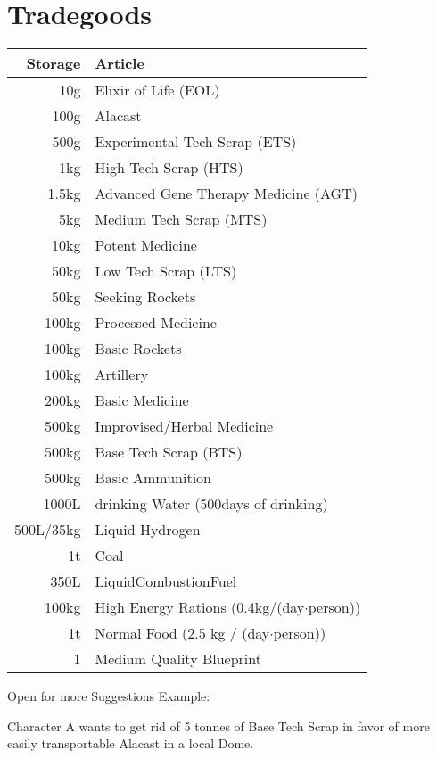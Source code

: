 \section{Tradegoods}\label{sec:tradegoods}
\begin{tabular}{|r|l|}
    \hline
    Storage & Article\\\hline
    10g & Elixir of Life (EOL)\\\hline
    100g & Alacast\\\hline
    500g & Experimental Tech Scrap (ETS)\\\hline
    1kg & High Tech Scrap (HTS)\\\hline
    1.5kg & Advanced Gene Therapy Medicine (AGT)\\\hline
    5kg & Medium Tech Scrap (MTS)\\\hline
    10kg & Potent Medicine\\\hline
    50kg & Low Tech Scrap (LTS)\\\hline
    50kg & Seeking Rockets\\\hline
    100kg & Processed Medicine\\\hline
    100kg & Basic Rockets\\\hline
    100kg & Artillery\\\hline
    200kg & Basic Medicine\\\hline
    500kg & Improvised/Herbal Medicine\\\hline
    500kg & Base Tech Scrap (BTS)\\\hline
    500kg & Basic Ammunition\\\hline
    1000L & drinking Water (500days of drinking)\\\hline
    500L/35kg & Liquid Hydrogen\\\hline
    1t & Coal\\\hline
    350L & LiquidCombustionFuel\\\hline
    100kg & High Energy Rations (0.4kg/(day\(\cdot\)person))\\\hline
    1t & Normal Food (2.5 kg / (day\(\cdot\)person))\\\hline
    1 & Medium Quality Blueprint\\\hline
\end{tabular}\par
Open for more Suggestions\vspace{1.5cm}
Example:\par
Character A wants to get rid of 5 tonnes of Base Tech Scrap in favor of more easily transportable Alacast in a local
Dome.\par
